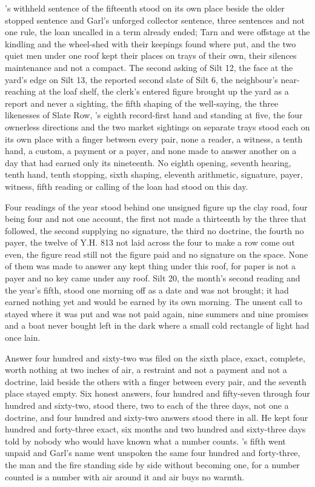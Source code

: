 's withheld sentence of the fifteenth stood on its own place beside the older stopped sentence and Garl's unforged collector sentence, three sentences and not one rule, the loan uncalled in a term already ended; Tarn and  were offstage at the kindling and the wheel-shed with their keepings found where put, and the two quiet men under one roof kept their places on trays of their own, their silences maintenance and not a compact. The second asking of Silt 12, the face at the yard's edge on Silt 13, the reported second slate of Silt 6, the neighbour's near-reaching at the loaf shelf, the clerk's entered figure brought up the yard as a report and never a sighting, the fifth shaping of the well-saying, the three likenesses of Slate Row, 's eighth record-first hand and  standing at five, the four ownerless directions and the two market sightings on separate trays stood each on its own place with a finger between every pair, none a reader, a witness, a tenth hand, a custom, a payment or a payer, and none made to answer another on a day that had earned only its nineteenth. No eighth opening, seventh hearing, tenth hand, tenth stopping, sixth shaping, eleventh arithmetic, signature, payer, witness, fifth reading or calling of the loan had stood on this day.

Four readings of the year stood behind one unsigned figure up the clay road, four being four and not one account, the first not made a thirteenth by the three that followed, the second supplying no signature, the third no doctrine, the fourth no payer, the twelve of Y.H. 813 not laid across the four to make a row come out even, the figure read still not the figure paid and no signature on the space. None of them was made to answer any kept thing under this roof, for paper is not a payer and no key came under any roof. Silt 20, the month's second reading and the year's fifth, stood one morning off as a date and was not brought; it had earned nothing yet and would be earned by its own morning. The unsent call to  stayed where it was put and was not paid again, nine summers and nine promises and a boat never bought left in the dark where a small cold rectangle of light had once lain.

Answer four hundred and sixty-two was filed on the sixth place, exact, complete, worth nothing at two inches of air, a restraint and not a payment and not a doctrine, laid beside the others with a finger between every pair, and the seventh place stayed empty. Six honest answers, four hundred and fifty-seven through four hundred and sixty-two, stood there, two to each of the three days, not one a doctrine, and four hundred and sixty-two answers stood there in all. He kept four hundred and forty-three exact, six months and two hundred and sixty-three days told by nobody who would have known what a number counts. 's fifth went unpaid and Garl's name went unspoken the same four hundred and forty-three, the man and the fire standing side by side without becoming one, for a number counted is a number with air around it and air buys no warmth.

